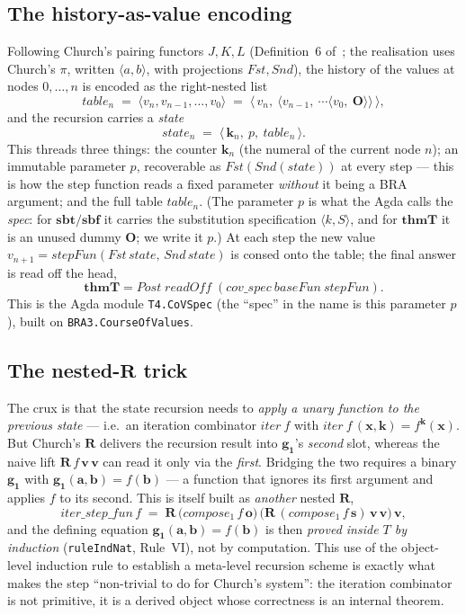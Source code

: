 \documentclass[11pt]{article}
\theoremstyle{plain}
\theoremstyle{definition}
\theoremstyle{remark}
\newcommand{\sbf}{\mathbf{sbf}}
\newcommand{\sbt}{\mathbf{sbt}}
\newcommand{\thmT}{\mathbf{thmT}}
\newcommand{\seq}[1]{\langle #1 \rangle}
\begin{document}
\subsection{The history-as-value encoding}

Following Church's pairing functors $J,K,L$ (Definition~6
of~\cite{Guard63}; the realisation uses Church's $\pi$, written
$\seq{a,b}$, with projections $\mathit{Fst},\mathit{Snd}$), the history of
the values at nodes $0,\ldots,n$ is encoded as the right-nested list
\[
\mathit{table}_n \;=\; \seq{v_n, v_{n-1}, \ldots, v_0} \;=\; \seq{\,v_n,\ \seq{v_{n-1},\ \cdots \seq{v_0,\ \mathbf{O}}}\,},
\]
and the recursion carries a \emph{state}
\[
\mathit{state}_n \;=\; \seq{\,\mathbf{k}_n,\ p,\ \mathit{table}_n\,}.
\]
This threads three things: the counter $\mathbf{k}_n$ (the numeral of the
current node $n$); an immutable parameter $p$, recoverable as
$\mathit{Fst}(\mathit{Snd}(\mathit{state}))$ at every step --- this is how
the step function reads a fixed parameter \emph{without} it being a BRA
argument; and the full table $\mathit{table}_n$.  (The parameter $p$ is
what the Agda calls the \emph{spec}: for $\sbt/\sbf$ it carries the
substitution specification $\seq{k,S}$, and for $\thmT$ it is an unused
dummy $\mathbf{O}$; we write it $p$.)  At each step the new value
$v_{n+1} = \mathit{stepFun}(\mathit{Fst}\,\mathit{state},\,
\mathit{Snd}\,\mathit{state})$ is consed onto the table; the final answer
is read off the head,
\[
\thmT = \mathit{Post}\;\mathit{readOff}\;(\mathit{cov\_spec}\ \mathit{baseFun}\ \mathit{stepFun}).
\]
This is the Agda module \verb|T4.CoVSpec| (the ``spec'' in the name is
this parameter $p$), built on \verb|BRA3.CourseOfValues|.

\subsection{The nested-\texorpdfstring{$\mathbf{R}$}{R} trick}

The crux is that the state recursion needs to \emph{apply a unary
function to the previous state} --- i.e.\ an iteration combinator
$\mathit{iter}\ f$ with $\mathit{iter}\ f\,(\mathbf{x},\mathbf{k}) =
f^{\mathbf{k}}(\mathbf{x})$.  But Church's $\mathbf{R}$ delivers the
recursion result into $\mathbf{g_1}$'s \emph{second} slot, whereas the
naive lift $\mathbf{R}\,f\,\mathbf{v}\,\mathbf{v}$ can read it only via
the \emph{first}.  Bridging the two requires a binary $\mathbf{g_1}$ with
$\mathbf{g_1}(\mathbf{a},\mathbf{b}) = f(\mathbf{b})$ --- a function that
ignores its first argument and applies $f$ to its second.  This is itself
built as \emph{another} nested $\mathbf{R}$,
\[
\mathit{iter\_step\_fun}\,f \;=\; \mathbf{R}\,\bigl(\mathit{compose_1}\,f\,\mathbf{o}\bigr)\,\bigl(\mathbf{R}\,(\mathit{compose_1}\,f\,\mathbf{s})\,\mathbf{v}\,\mathbf{v}\bigr)\,\mathbf{v},
\]
and the defining equation $\mathbf{g_1}(\mathbf{a},\mathbf{b}) =
f(\mathbf{b})$ is then \emph{proved inside $T$ by induction}
(\texttt{ruleIndNat}, Rule~VI), not by computation.  This use of the
object-level induction rule to establish a meta-level recursion scheme is
exactly what makes the step ``non-trivial to do for Church's system'':
the iteration combinator is not primitive, it is a derived object whose
correctness is an internal theorem.
\end{document}
